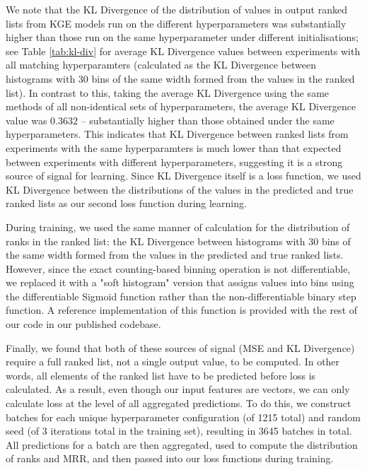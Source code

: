 We note that the KL Divergence of the distribution of values in output ranked lists from KGE models run on the different hyperparameters was substantially higher than those run on the same hyperparameter under different initialisations; see Table \ref{tab:kl-div} for average KL Divergence values between experiments with all matching hyperparamters (calculated as the KL Divergence between histograms with 30 bins of the same width formed from the values in the ranked list). In contrast to this, taking the average KL Divergence using the same methods of all non-identical sets of hyperparameters, the average KL Divergence value was $0.3632$ -- substantially higher than those obtained under the same hyperparameters. This indicates that KL Divergence between ranked lists from experiments with the same hyperparamters is much lower than that expected between experiments with different hyperparameters, suggesting it is a strong source of signal for learning. Since KL Divergence itself is a loss function, we used KL Divergence between the distributions of the values in the predicted and true ranked lists as our second loss function during learning.

During training, we used the same manner of calculation for the distribution of ranks in the ranked list: the KL Divergence between histograms with 30 bins of the same width formed from the values in the predicted and true ranked lists. However, since the exact counting-based binning operation is not differentiable, we replaced it with a "soft histogram" version that assigns values into bins using the differentiable Sigmoid function rather than the non-differentiable binary step function. A reference implementation of this function is provided with the rest of our code in our published codebase.

Finally, we found that both of these sources of signal (MSE and KL Divergence) require a full ranked list, not a single output value, to be computed. In other words, all elements of the ranked list have to be predicted before loss is calculated. As a result, even though our input features are vectors, we can only calculate loss at the level of all aggregated predictions. To do this, we construct batches for each unique hyperparameter configuration (of 1215 total) and random seed (of 3 iterations total in the training set), resulting in 3645 batches in total. All predictions for a batch are then aggregated, used to compute the distribution of ranks and MRR, and then passed into our loss functions during training.

